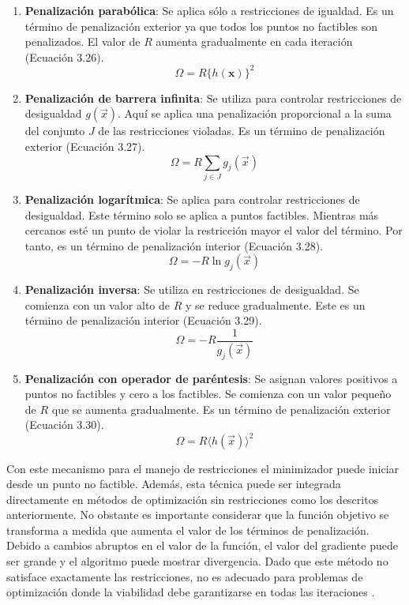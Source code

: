 \begin{enumerate}
\item \textbf{Penalización parabólica}: Se aplica sólo a restricciones de igualdad. Es un término de penalización exterior ya que todos los puntos no factibles son penalizados. El valor de $R$ aumenta gradualmente en cada iteración (Ecuación 3.26).
\begin{equation}
\Omega=R \{h(\textbf{x})\}^2
\end{equation}

\item \textbf{Penalización de barrera infinita}: Se utiliza para controlar restricciones de desigualdad $g(\vec{x})$. Aquí se aplica una penalización proporcional a la suma del conjunto $J$ de las restricciones violadas. Es un término de penalización exterior  (Ecuación 3.27).
\begin{equation}
\Omega=R \sum_{j \in J} g_j(\vec{x})
\end{equation}

\item \textbf{Penalización logarítmica}: Se aplica para controlar restricciones de desigualdad. Este término solo se aplica a puntos factibles. Mientras más cercanos esté un punto de violar la restricción mayor el valor del término. Por tanto, es un término de penalización interior (Ecuación 3.28).
\begin{equation}
\Omega=- R \ln{g_j(\vec{x})}
\end{equation}
\item \textbf{Penalización inversa}: Se utiliza en restricciones de desigualdad. Se comienza con un valor alto de $R$ y se reduce gradualmente. Este es un término de penalización interior  (Ecuación 3.29).
\begin{equation}
\Omega=- R \frac{1}{g_j(\vec{x})}
\end{equation}

\item \textbf{Penalización con operador de paréntesis}: Se asignan valores positivos a puntos no factibles y cero a los factibles.  Se comienza con un valor pequeño de $R$ que se aumenta gradualmente. Es un término de penalización exterior  (Ecuación 3.30).  
\begin{equation}
\Omega=R \langle h(\vec{x})\rangle ^2
\end{equation}
\end{enumerate}

Con este mecanismo para el manejo de restricciones el minimizador puede iniciar desde un punto no factible. Además, esta técnica puede ser integrada directamente en métodos de optimización sin restricciones como los descritos anteriormente. No obstante es importante considerar que la  función objetivo se transforma a medida que aumenta el valor de los términos de penalización. Debido a cambios abruptos en el valor de la función, el valor del gradiente puede ser grande y el algoritmo puede mostrar divergencia. Dado que este método no satisface exactamente las restricciones, no es adecuado para problemas de optimización donde la viabilidad debe garantizarse en todas las iteraciones \cite{arora_optimization:_2015}.

